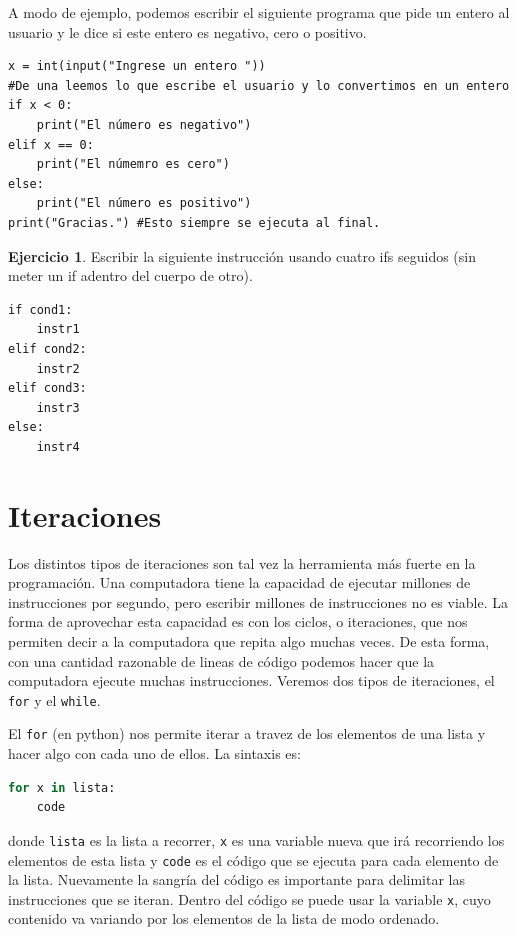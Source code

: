 \documentclass[a4paper, 12pt]{report}
\theoremstyle{definition}
\newtheorem{ejercicio}{Ejercicio}[section]
\begin{document}
A modo de ejemplo, podemos escribir el siguiente programa que pide un entero al usuario y le dice si este entero es negativo, cero o positivo.
\begin{verbatim}
x = int(input("Ingrese un entero "))
#De una leemos lo que escribe el usuario y lo convertimos en un entero
if x < 0:
    print("El número es negativo")
elif x == 0:
    print("El númemro es cero")
else:
    print("El número es positivo")
print("Gracias.") #Esto siempre se ejecuta al final.
\end{verbatim}

\begin{ejercicio}
	Escribir la siguiente instrucción usando cuatro ifs seguidos (sin meter un if adentro del cuerpo de otro).
\begin{verbatim}
if cond1:
    instr1
elif cond2:
    instr2
elif cond3:
    instr3
else:
    instr4
\end{verbatim}

\end{ejercicio}

\section{Iteraciones}

Los distintos tipos de iteraciones son tal vez la herramienta más fuerte en la programación. Una computadora tiene la capacidad de ejecutar millones de instrucciones por segundo, pero escribir millones de instrucciones no es viable. La forma de aprovechar esta capacidad es con los ciclos, o iteraciones, que nos permiten decir a la computadora que repita algo muchas veces. De esta forma, con una cantidad razonable de lineas de código podemos hacer que la computadora ejecute muchas instrucciones. Veremos dos tipos de iteraciones, el {\tt for} y el {\tt while}.

El {\tt for} (en python) nos permite iterar a travez de los elementos de una lista y hacer algo con cada uno de ellos. La sintaxis es:
\begin{lstlisting}[language=python]
for x in lista:
    code
\end{lstlisting}
donde {\tt lista} es la lista a recorrer, {\tt x} es una variable nueva que irá recorriendo los elementos de esta lista y {\tt code} es el código que se ejecuta para cada elemento de la lista. Nuevamente la sangría del código es importante para delimitar las instrucciones que se iteran. Dentro del código se puede usar la variable {\tt x}, cuyo contenido va variando por los elementos de la lista de modo ordenado.
\end{document}
